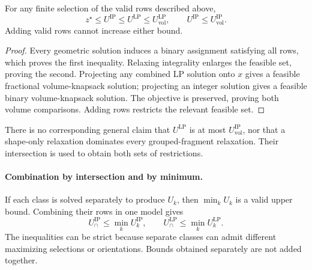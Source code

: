 \begin{theorem}\label{thm:dominance}
For any finite selection of the valid rows described above,
\begin{equation}
 z^\star\leq U^{\mathrm{IP}}\leq U^{\mathrm{LP}}
                         \leq U_{\mathrm{vol}}^{\mathrm{LP}},
 \qquad U^{\mathrm{IP}}\leq U_{\mathrm{vol}}^{\mathrm{IP}}.
                                                               \label{eq:dominance}
\end{equation}
Adding valid rows cannot increase either bound.
\end{theorem}
\begin{proof}
Every geometric solution induces a binary assignment satisfying all
rows, which proves the first inequality. Relaxing integrality enlarges
the feasible set, proving the second. Projecting any combined LP
solution onto $x$ gives a feasible fractional volume-knapsack solution;
projecting an integer solution gives a feasible binary volume-knapsack
solution. The objective is preserved, proving both volume comparisons.
Adding rows restricts the relevant feasible set.
\end{proof}
There is no corresponding general claim that $U^{\mathrm{LP}}$ is at
most $U_{\mathrm{vol}}^{\mathrm{IP}}$, nor that a shape-only relaxation
dominates every grouped-fragment relaxation. Their intersection is
used to obtain both sets of restrictions.

\paragraph{Combination by intersection and by minimum.}
If each class is solved separately to produce $U_k$, then $\min_k U_k$
is a valid upper bound. Combining their rows in one model gives
\begin{equation}
 U_{\cap}^{\mathrm{IP}}\leq\min_k U_k^{\mathrm{IP}},\qquad
 U_{\cap}^{\mathrm{LP}}\leq\min_k U_k^{\mathrm{LP}}.             \label{eq:intersection}
\end{equation}
The inequalities can be strict because separate classes can admit
different maximizing selections or orientations. Bounds obtained
separately are not added together.


